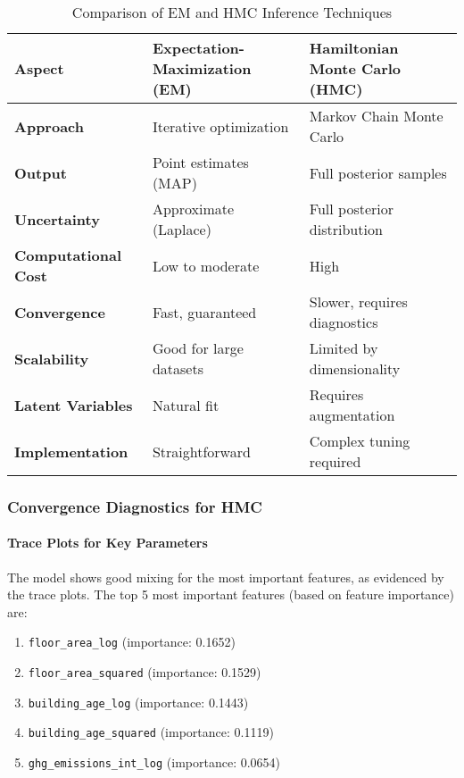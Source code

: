 \begin{table}[h]
\centering
\caption{Comparison of EM and HMC Inference Techniques}
\label{tab:inference_comparison}
\begin{tabular}{|l|l|l|}
\hline
\textbf{Aspect} & \textbf{Expectation-Maximization (EM)} & \textbf{Hamiltonian Monte Carlo (HMC)} \\
\hline
\textbf{Approach} & Iterative optimization & Markov Chain Monte Carlo \\
\hline
\textbf{Output} & Point estimates (MAP) & Full posterior samples \\
\hline
\textbf{Uncertainty} & Approximate (Laplace) & Full posterior distribution \\
\hline
\textbf{Computational Cost} & Low to moderate & High \\
\hline
\textbf{Convergence} & Fast, guaranteed & Slower, requires diagnostics \\
\hline
\textbf{Scalability} & Good for large datasets & Limited by dimensionality \\
\hline
\textbf{Latent Variables} & Natural fit & Requires augmentation \\
\hline
\textbf{Implementation} & Straightforward & Complex tuning required \\
\hline
\end{tabular}
\end{table}

\subsubsection{Convergence Diagnostics for HMC}

\paragraph{Trace Plots for Key Parameters}
The model shows good mixing for the most important features, as evidenced by the trace plots. The top 5 most important features (based on feature importance) are:

\begin{enumerate}
    \item \texttt{floor\_area\_log} (importance: 0.1652)
    \item \texttt{floor\_area\_squared} (importance: 0.1529)
    \item \texttt{building\_age\_log} (importance: 0.1443)
    \item \texttt{building\_age\_squared} (importance: 0.1119)
    \item \texttt{ghg\_emissions\_int\_log} (importance: 0.0654)
\end{enumerate}

